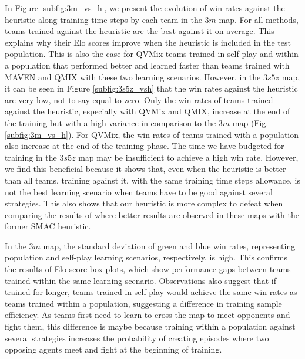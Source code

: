 \begin{figure}
    
\end{figure}

In Figure \ref{subfig:3m_vs_h}, we present the evolution of win rates against the heuristic along training time steps by each team in the $3m$ map.
For all methods, teams trained against the heuristic are the best against it on average.
This explains why their Elo scores improve when the heuristic is included in the test population.
This is also the case for QVMix teams trained in self-play and within a population that performed better and learned faster than teams trained with MAVEN and QMIX with these two learning scenarios.
However, in the $3s5z$ map, it can be seen in Figure \ref{subfig:3s5z_vsh} that the win rates against the heuristic are very low, not to say equal to zero.
Only the win rates of teams trained against the heuristic, especially with QVMix and QMIX, increase at the end of the training but with a high variance in comparison to the $3m$ map (Fig. \ref{subfig:3m_vs_h}).
For QVMix, the win rates of teams trained with a population also increase at the end of the training phase.
The time we have budgeted for training in the $3s5z$ map may be insufficient to achieve a high win rate.
However, we find this beneficial because it shows that, even when the heuristic is better than all teams, training against it, with the same training time steps allowance, is not the best learning scenario when teams have to be good against several strategies.
This also shows that our heuristic is more complex to defeat when comparing the results of \citep{Rashid2018,Mahajan2019MAVEN:Exploration,leroy2020qvmix} where better results are observed in these maps with the former SMAC heuristic.

In the $3m$ map, the standard deviation of green and blue win rates, representing population and self-play learning scenarios, respectively, is high.
This confirms the results of Elo score box plots, which show performance gaps between teams trained within the same learning scenario.
Observations also suggest that if trained for longer, teams trained in self-play would achieve the same win rates as teams trained within a population, suggesting a difference in training sample efficiency.
As teams first need to learn to cross the map to meet opponents and fight them, this difference is maybe because training within a population against several strategies increases the probability of creating episodes where two opposing agents meet and fight at the beginning of training.

